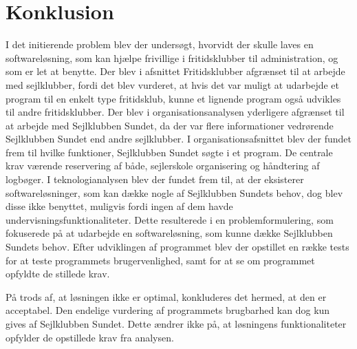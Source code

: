 \chapter{Konklusion}
I det initierende problem blev der undersøgt, hvorvidt der skulle laves en softwareløsning, som kan hjælpe frivillige i fritidsklubber til administration, og som er let at benytte. 
Der blev i afsnittet Fritidsklubber afgrænset til at arbejde med sejlklubber, fordi det blev vurderet, at hvis det var muligt at udarbejde et program til en enkelt type fritidsklub, kunne et lignende program også udvikles til andre fritidsklubber. 
Der blev i organisationsanalysen yderligere afgrænset til at arbejde med Sejlklubben Sundet, da der var flere informationer vedrørende Sejlklubben Sundet end andre sejlklubber. 
I organisationsafsnittet blev der fundet frem til hvilke funktioner, Sejlklubben Sundet søgte i et program.
De centrale krav værende reservering af både, sejlerskole organisering og håndtering af logbøger. 
I teknologianalysen blev der fundet frem til, at der eksisterer softwareløsninger, som kan dække nogle af Sejlklubben Sundets behov, dog blev disse ikke benyttet, muligvis fordi ingen af dem havde undervisningsfunktionaliteter. 
Dette resulterede i en problemformulering, som fokuserede på at udarbejde en softwareløsning, som kunne dække Sejlklubben Sundets behov. 
Efter udviklingen af programmet blev der opstillet en række tests for at teste programmets brugervenlighed, samt for at se om programmet opfyldte de stillede krav.

På trods af, at løsningen ikke er optimal, konkluderes det hermed, at den er acceptabel. 
Den endelige vurdering af programmets brugbarhed kan dog kun gives af Sejlklubben Sundet.
Dette ændrer ikke på, at løsningens funktionaliteter opfylder de opstillede krav fra analysen. 
